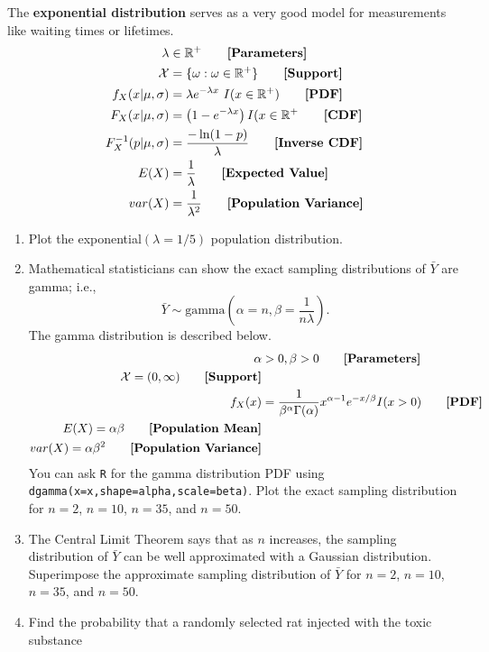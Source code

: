 \documentclass{article}\usepackage[]{graphicx}\usepackage[]{color}
\begin{document}
\begin{enumerate}
  The \textbf{exponential distribution} serves as a very good model for measurements like waiting times or lifetimes.
  \begin{align*}
  \lambda &\in \mathbb{R^+}  \tag*{\textbf{[Parameters]}}\\
  \mathcal{X}&= \{\omega: \omega \in \mathbb{R^+}\} \tag*{\textbf{[Support]}}\\
  f_X(x|\mu,\sigma) &= \lambda e^{-\lambda x}~ I(x \in \mathbb{R^+}) \tag*{\textbf{[PDF]}}\\
  F_X(x|\mu,\sigma) &= \left(1- e^{-\lambda x}\right)I(x \in \mathbb{R^+}\tag*{\textbf{[CDF]}}\\
  F_X^{-1}(p|\mu,\sigma) &= \frac{-\ln(1-p)}{\lambda} \tag*{\textbf{[Inverse CDF]}}\\
  E(X) &= \frac{1}{\lambda} \tag*{\textbf{[Expected Value]}}\\
  var(X) &= \frac{1}{\lambda^2}\tag*{\textbf{[Population Variance]}}\\
  \end{align*}
	\begin{enumerate}
	  \item Plot the exponential$(\lambda = 1/5)$ population distribution.
	  \item Mathematical statisticians can show the exact sampling distributions 
	  of $\bar{Y}$ are gamma; i.e.,
	  \[\bar{Y} \sim \textrm{gamma}(\alpha=n,\beta=\frac{1}{n\lambda}).\]
	  The gamma distribution is described below.
\begin{align*}
\alpha &> 0, \beta>0 \tag*{\textbf{[Parameters]}}\\
\mathcal{X} = (0, \infty)\tag*{\textbf{[Support]}}\\
f_X(x) &= \frac{1}{\beta^\alpha \Gamma(\alpha)} x^{\alpha-1} e^{-x/\beta} I(x>0)
\tag*{\textbf{[PDF]}}\\
E(X) = \alpha \beta \tag*{\textbf{[Population Mean]}}\\
var(X) = \alpha \beta^2 \tag*{\textbf{[Population Variance]}}
\end{align*}
You can ask \texttt{R} for the gamma distribution PDF using 
\texttt{dgamma(x=x,shape=alpha,scale=beta)}.
Plot the exact sampling distribution for $n=2$, $n=10$, $n=35$, and
$n=50$.
	  \item The Central Limit Theorem says that as $n$ increases, the sampling 
	  distribution of $\bar{Y}$ can be well approximated with a Gaussian 
	  distribution. Superimpose the approximate sampling distribution of $\bar{Y}$
	  for $n=2$, $n=10$, $n=35$, and $n=50$.
	  \item Find the probability that a randomly selected rat injected with the toxic substance

\end{enumerate}
\end{enumerate}
\end{document}
